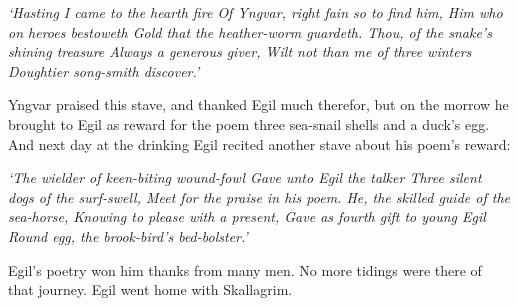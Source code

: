 {\centering\emph{
	`Hasting I came to the hearth fire
	Of Yngvar, right fain so to find him,
	Him who on heroes bestoweth
	Gold that the heather-worm guardeth.
	Thou, of the snake's shining treasure
	Always a generous giver,
	Wilt not than me of three winters
	Doughtier song-smith discover.'
}}


Yngvar praised this stave, and thanked Egil much therefor, but on the morrow he brought to Egil as reward for the poem three sea-snail shells and a duck's egg. And next day at the drinking Egil recited another stave about his poem's reward:

{\centering\emph{
	`The wielder of keen-biting wound-fowl
	Gave unto Egil the talker
	Three silent dogs of the surf-swell,
	Meet for the praise in his poem.
	He, the skilled guide of the sea-horse,
	Knowing to please with a present,
	Gave as fourth gift to young Egil
	Round egg, the brook-bird's bed-bolster.'
}}

Egil's poetry won him thanks from many men. No more tidings were there of that journey. Egil went home with Skallagrim.
